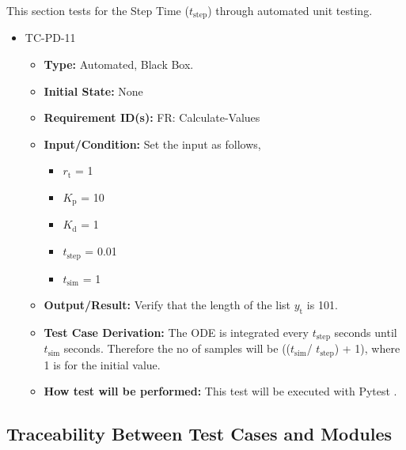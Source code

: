 \documentclass[12pt, titlepage]{article}
\begin{document}
This section tests for the Step Time (${t_{\text{step}}}$) through automated unit testing.

\begin{itemize}
\item{TC-PD-11\\}
\begin{itemize}

\item{\textbf{Type:}}  Automated, Black Box.
					
\item{\textbf{Initial State:}} None

\item{\textbf{Requirement ID(s):}}  FR: Calculate-Values
					
\item{\textbf{Input/Condition:}}  Set the input as follows,

\begin{itemize}
\item ${r_{\text{t}}}$ = 1
\item ${K_{\text{p}}}$ = 10
\item ${K_{\text{d}}}$ = 1
\item ${t_{\text{step}}}$ = 0.01
\item ${t_{\text{sim}}}$ = 1 
\end{itemize}

\item{\textbf{Output/Result:}} Verify that the length of the list ${y_{\text{t}}}$ is 101.

\item{\textbf{Test Case Derivation:}} The ODE is integrated every  ${t_{\text{step}}}$ seconds 
until  ${t_{\text{sim}}}$ seconds. Therefore the no of samples will be  
((${t_{\text{sim}}}$/ ${t_{\text{step}}}$) + 1), where 1 is for the initial value.

\item{\textbf{How test will be performed:}}  This test will be executed with Pytest \cite{Pytest}.

\end{itemize}
\end{itemize}

					
\subsection{Traceability Between Test Cases and Modules}

				
\end{document}
